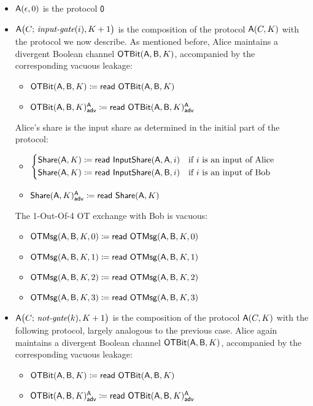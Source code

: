 \begin{itemize}
\item $\mathsf{A}(\epsilon,0)$ is the protocol $\mathsf{0}$
\item $\mathsf{A}\big(C; \, \textit{input-gate}(i),K+1\big)$ is the composition of the protocol $\mathsf{A}(C,K)$ with the protocol we now describe. As mentioned before, Alice maintains a divergent Boolean channel $\mathsf{OTBit}(\mathsf{A},\mathsf{B},K)$, accompanied by the corresponding vacuous leakage:
\begin{itemize}
\item $\mathsf{OTBit}(\mathsf{A},\mathsf{B},K) \coloneqq \mathsf{read} \ \mathsf{OTBit}(\mathsf{A},\mathsf{B},K)$
\item {\color{blue} $\mathsf{OTBit}(\mathsf{A},\mathsf{B},K)^{\mathsf{A}}_{\mathsf{adv}} \coloneqq \mathsf{read} \ \mathsf{OTBit}(\mathsf{A},\mathsf{B},K)^{\mathsf{A}}_{\mathsf{adv}}$}
\end{itemize}
Alice's share is the input share as determined in the initial part of the protocol:
\begin{itemize}
\item $\begin{cases*} \Share(\A,K) \coloneqq \read{\InputShare(\A,\A,i)} & \text{if $i$ is an input of Alice} \\ \Share(\A,K) \coloneqq \read{\InputShare(\A,\B,i)} & \text{if $i$ is an input of Bob} \end{cases*}$
\item {\color{blue} $\mathsf{Share}(\mathsf{A},K)^{\mathsf{A}}_{\mathsf{adv}} \coloneqq \mathsf{read} \ \mathsf{Share}(\mathsf{A},K)$}
\end{itemize}
The 1-Out-Of-4 OT exchange with Bob is vacuous:
\begin{itemize}
\item $\mathsf{OTMsg}(\mathsf{A},\mathsf{B},K,0) \coloneqq \mathsf{read} \ \mathsf{OTMsg}(\mathsf{A},\mathsf{B},K,0)$
\item $\mathsf{OTMsg}(\mathsf{A},\mathsf{B},K,1) \coloneqq \mathsf{read} \ \mathsf{OTMsg}(\mathsf{A},\mathsf{B},K,1)$
\item $\mathsf{OTMsg}(\mathsf{A},\mathsf{B},K,2) \coloneqq \mathsf{read} \ \mathsf{OTMsg}(\mathsf{A},\mathsf{B},K,2)$
\item $\mathsf{OTMsg}(\mathsf{A},\mathsf{B},K,3) \coloneqq \mathsf{read} \ \mathsf{OTMsg}(\mathsf{A},\mathsf{B},K,3)$
\end{itemize}
\item $\mathsf{A}\big(C; \, \textit{not-gate}(k),K+1\big)$ is the composition of the protocol $\mathsf{A}(C,K)$ with the following protocol, largely analogous to the previous case. Alice again maintains a divergent Boolean channel $\mathsf{OTBit}(\mathsf{A},\mathsf{B},K)$, accompanied by the corresponding vacuous leakage:
\begin{itemize}
\item $\mathsf{OTBit}(\mathsf{A},\mathsf{B},K) \coloneqq \mathsf{read} \ \mathsf{OTBit}(\mathsf{A},\mathsf{B},K)$
\item {\color{blue} $\mathsf{OTBit}(\mathsf{A},\mathsf{B},K)^{\mathsf{A}}_{\mathsf{adv}} \coloneqq \mathsf{read} \ \mathsf{OTBit}(\mathsf{A},\mathsf{B},K)^{\mathsf{A}}_{\mathsf{adv}}$}

\end{itemize}
\end{itemize}
